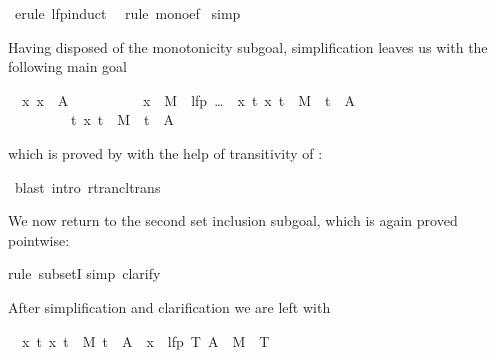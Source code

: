 \begin{isabellebody}
\begin{isamarkuptxt}
\end{isamarkuptxt}%
\ erule\ lfp{\isacharunderscore}induct{\isacharparenright}\isanewline
\ \ rule\ mono{\isacharunderscore}ef{\isacharparenright}\isanewline
\ simp{\isacharparenright}%
\begin{isamarkuptxt}%
\noindent
Having disposed of the monotonicity subgoal,
simplification leaves us with the following main goal
\begin{isabelle}
\ {}{\isachardot}\ {\isasymAnd}x{\isachardot}\ x\ {\isasymin}\ A\ {\isasymor}\isanewline
\ \ \ \ \ \ \ \ \ x\ {\isasymin}\ M{\isasyminverse}\ {\isacharbackquote}{\isacharbackquote}{\isacharbackquote}\ {\isacharparenleft}lfp\ {\isacharparenleft}\dots{\isacharparenright}\ {\isasyminter}\ {\isacharbraceleft}x{\isachardot}\ {\isasymexists}t{\isachardot}\ {\isacharparenleft}x{\isacharcomma}\ t{\isacharparenright}\ {\isasymin}\ M\isactrlsup {\isacharasterisk}\ {\isasymand}\ t\ {\isasymin}\ A{\isacharbraceright}{\isacharparenright}\isanewline
\ \ \ \ \ \ \ \ {\isasymLongrightarrow}\ {\isasymexists}t{\isachardot}\ {\isacharparenleft}x{\isacharcomma}\ t{\isacharparenright}\ {\isasymin}\ M\isactrlsup {\isacharasterisk}\ {\isasymand}\ t\ {\isasymin}\ A
\end{isabelle}
which is proved by  with the help of transitivity of \isa{\isactrlsup {\isacharasterisk}}:%
\end{isamarkuptxt}%
\ blast\ intro{\isacharcolon}\ rtrancl{\isacharunderscore}trans{\isacharparenright}%
\begin{isamarkuptxt}%
We now return to the second set inclusion subgoal, which is again proved
pointwise:%
\end{isamarkuptxt}%
rule\ subsetI{\isacharparenright}\isanewline
{}simp{\isacharcomma}\ clarify{\isacharparenright}%
\begin{isamarkuptxt}%
\noindent
After simplification and clarification we are left with
\begin{isabelle}%
\ {}{\isachardot}\ {\isasymAnd}x\ t{\isachardot}\ {\isasymlbrakk}{\isacharparenleft}x{\isacharcomma}\ t{\isacharparenright}\ {\isasymin}\ M\isactrlsup {\isacharasterisk}{\isacharsemicolon}\ t\ {\isasymin}\ A{\isasymrbrakk}\ {\isasymLongrightarrow}\ x\ {\isasymin}\ lfp\ {\isacharparenleft}{\isasymlambda}T{\isachardot}\ A\ {\isasymunion}\ M{\isasyminverse}\ {\isacharbackquote}{\isacharbackquote}\ T{\isacharparenright}%

\end{isabelle}
\end{isamarkuptxt}
\end{isabellebody}
